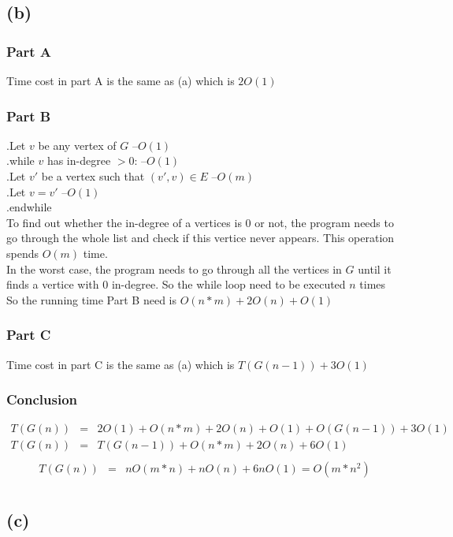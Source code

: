 \documentclass{article} %
\begin{document}
\subsection*{(b)}
\subsubsection*{Part A}
Time cost in part A is the same as (a) which is $2O(1)$\\
\subsubsection*{Part B}
.\quad Let $v$ be any vertex of $G$ \quad--$O(1)$\\
.\quad while $v$ has in-degree $> 0$: \quad--$O(1)$\\
.\quad\quad Let $v'$ be a vertex such that $(v', v) \in E$ \quad--$O(m)$\\
.\quad\quad Let $v = v'$ \quad--$O(1)$\\
.\quad endwhile\\
To find out whether the in-degree of a vertices is 0 or not, the program needs to go through the whole list and check if this vertice never appears. This operation spends $O(m)$ time.\\
In the worst case, the program needs to go through all the vertices in $G$ until it finds a vertice with 0 in-degree. So the while loop need to be executed $n$ times\\ 
So the running time Part B need is $O(n*m)+2O(n)+O(1)$
\subsubsection*{Part C}
Time cost in part C is the same as (a) which is $T(G(n-1))+3O(1)$\\
\subsubsection*{Conclusion}
\[\begin{array}{rll}
    T(G(n)) &=&2O(1)+O(n*m)+2O(n)+O(1) +O(G(n-1)) +3O(1)\\
    T(G(n)) &=&T(G(n-1)) +O(n*m)+2O(n)+6O(1)\\
\end{array}\]
\[\begin{array}{rll}
    T(G(n)) &=& nO(m*n) + nO(n)+6nO(1) = O(m*n^2)\\
\end{array}\]
\subsection*{(c)}
\end{document}
